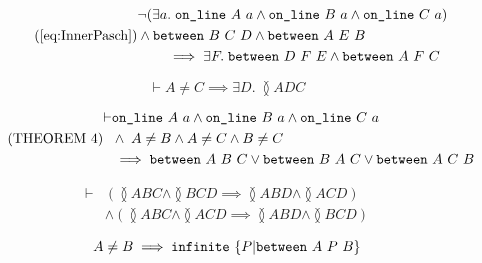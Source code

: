 \begin{equation}
  \tag{\ref{eq:InnerPasch}}
  \begin{split}
    &\Triangle{a}{A}{B}{C}\\ & \wedge \between{B}{C}{D} \wedge \between{A}{E}{B}\\ 
    &\qquad\implies \exists F.\; \between{D}{F}{E} \wedge \between{A}{F}{C}
  \end{split}
\end{equation}

\begin{equation}\label{eq:three}\tag{THEOREM~3}
\vdash A \neq C \implies \exists D.\; \between{A}{D}{C}
\end{equation}

\begin{equation}\label{eq:four}\tag{THEOREM~4}
  \begin{split}
    \vdash&\texttt{on\_line}\ A\ a \wedge \texttt{on\_line}\ B\ a \wedge \texttt{on\_line}\ C\ a \\
    &\wedge\; A \neq B \wedge A \neq C \wedge B \neq C\\
    &\implies \texttt{between}\ A\ B\ C \vee \texttt{between}\ B\ A\ C \vee \texttt{between}\ A\ C\ B
  \end{split}
\end{equation}

\begin{equation}\label{eq:five}\tag{THEOREM~5}
  \begin{split}
    \vdash&(\between{A}{B}{C} \wedge \between{B}{C}{D} \implies \between{A}{B}{D} \wedge \between{A}{C}{D})\\
    &\wedge(\between{A}{B}{C} \wedge \between{A}{C}{D} \implies \between{A}{B}{D} \wedge \between{B}{C}{D})
  \end{split}
\end{equation}

\begin{equation*}
  A \neq B \implies \texttt{infinite}\ \{ P \vert \texttt{between}\ A\ P\ B \}
\end{equation*}

